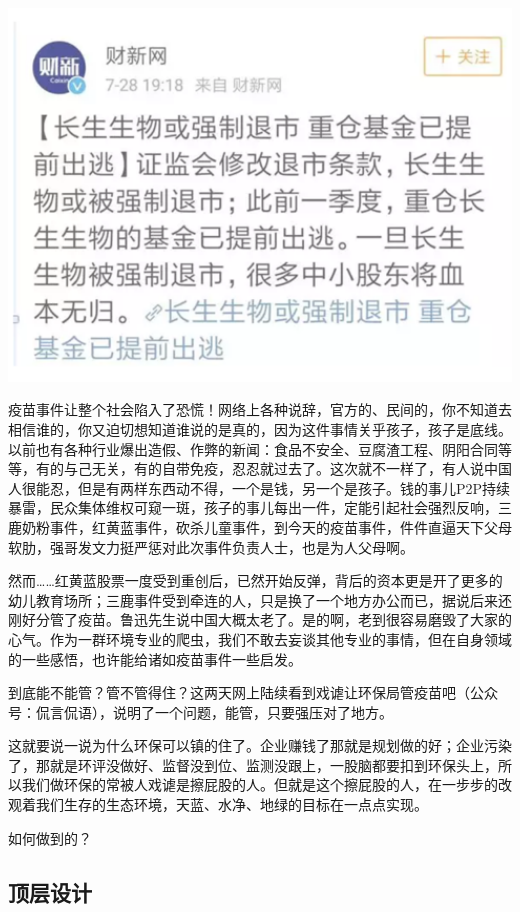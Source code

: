 \documentclass[]{book}
\begin{document}
\includegraphics[width=6.67in]{images/fw1}

疫苗事件让整个社会陷入了恐慌！网络上各种说辞，官方的、民间的，你不知道去相信谁的，你又迫切想知道谁说的是真的，因为这件事情关乎孩子，孩子是底线。以前也有各种行业爆出造假、作弊的新闻：食品不安全、豆腐渣工程、阴阳合同等等，有的与己无关，有的自带免疫，忍忍就过去了。这次就不一样了，有人说中国人很能忍，但是有两样东西动不得，一个是钱，另一个是孩子。钱的事儿P2P持续暴雷，民众集体维权可窥一斑，孩子的事儿每出一件，定能引起社会强烈反响，三鹿奶粉事件，红黄蓝事件，砍杀儿童事件，到今天的疫苗事件，件件直逼天下父母软肋，强哥发文力挺严惩对此次事件负责人士，也是为人父母啊。

然而\ldots{}\ldots{}红黄蓝股票一度受到重创后，已然开始反弹，背后的资本更是开了更多的幼儿教育场所；三鹿事件受到牵连的人，只是换了一个地方办公而已，据说后来还刚好分管了疫苗。鲁迅先生说中国大概太老了。是的啊，老到很容易磨毁了大家的心气。作为一群环境专业的爬虫，我们不敢去妄谈其他专业的事情，但在自身领域的一些感悟，也许能给诸如疫苗事件一些启发。

到底能不能管？管不管得住？这两天网上陆续看到戏谑让环保局管疫苗吧（公众号：侃言侃语），说明了一个问题，能管，只要强压对了地方。

这就要说一说为什么环保可以镇的住了。企业赚钱了那就是规划做的好；企业污染了，那就是环评没做好、监督没到位、监测没跟上，一股脑都要扣到环保头上，所以我们做环保的常被人戏谑是擦屁股的人。但就是这个擦屁股的人，在一步步的改观着我们生存的生态环境，天蓝、水净、地绿的目标在一点点实现。

如何做到的？

\hypertarget{ux9876ux5c42ux8bbeux8ba1}{%
\subsection{顶层设计}\label{ux9876ux5c42ux8bbeux8ba1}}
\end{document}
